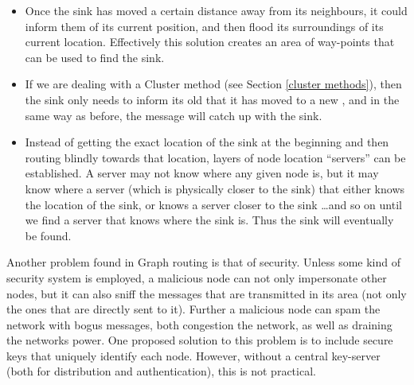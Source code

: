 \documentclass[letter, 12pt, english, draft]{article}
\begin{document}
\begin{itemize}
\item Once the sink has moved a certain distance away from its neighbours, it could inform them of its current position, and then flood its surroundings of its current location. Effectively this solution creates an area of way-points that can be used to find the sink.
\item If we are dealing with a Cluster method (see Section \ref{cluster methods}), then the sink only needs to inform its old \ch that it has moved to a new \ch, and in the same way as before, the message will catch up with the sink.
\item Instead of getting the exact location of the sink at the beginning and then routing blindly towards that location, layers of node location ``servers'' can be established. A server may not know where any given node is, but it may know where a server (which is physically closer to the sink) that either knows the location of the sink, or knows a server closer to the sink \ldots and so on until we find a server that knows where the sink is. Thus the sink will eventually be found.
\end{itemize}

Another problem found in Graph routing is that of security. Unless some kind of security system is employed, a malicious node can not only impersonate other nodes, but it can also sniff the messages that are transmitted in its area (not only the ones that are directly sent to it). Further a malicious node can spam the network with bogus messages, both congestion the network, as well as draining the networks power. One proposed solution to this problem is to include secure keys that uniquely identify each node. However, without a central key-server (both for distribution and authentication), this is not practical.




{}
\end{document}
